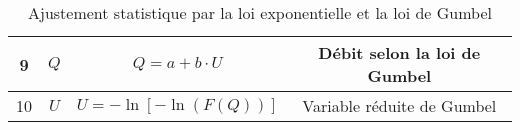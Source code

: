 \begin{table}[H]
\begin{tabular}{c|cc|c}
        \hline
        9  & $Q$                                & $Q = a + b \cdot U$                                                                                                                       & Débit selon la loi de Gumbel \\
        \hline
        10 & $U$                                & $U = -\ln \left[ -\ln \left(F(Q)\right)\right]$                                                                                          & Variable réduite de Gumbel   \\
    \end{tabular}
    \caption{Ajustement statistique par la loi exponentielle et la loi de Gumbel}
    \label{tab:loiGumbelAjuste}
\end{table}